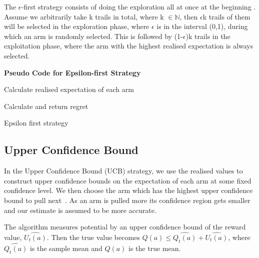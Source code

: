     The $\epsilon$-first strategy consists of doing the exploration all at once at the beginning \citep{vermorel}.
    Assume we arbitrarily take k trails in total, where k $\in \mathbb{N}$, then $\epsilon$k trails of them will be selected in the exploration phase, where $\epsilon$ is in the interval (0,1), during which an arm is randomly selected.
    This is followed by (1-$\epsilon$)k trails in the exploitation phase, where the arm with the highest realised expectation is always selected.
    \par
    \textbf{Pseudo Code for Epsilon-first Strategy}
    \newline
    \begin{algorithm}[H]
        Calculate realised expectation of each arm\;

        Calculate and return regret
        \caption{Epsilon first strategy}\label{alg:epsilon_algorithm}
    \end{algorithm}

    \subsection{Upper Confidence Bound}\label{subsec:upper-confidence-bound}
    In the Upper Confidence Bound (UCB) strategy, we use the realised values to construct upper confidence bounds on the expectation of each arm at some fixed confidence level.
    We then choose the arm which has the highest upper confidence bound to pull next~\citep{SVGarbar2012}. As an arm is pulled more its confidence region gets smaller and our estimate is assumed to be more accurate.
    \par
    The algorithm measures potential by an upper confidence bound of the reward value, $\widehat{U_t (a)}$.
    Then the true value becomes $ Q(a)  \leq \widehat{Q_t (a)}+\widehat{U_t (a)} $, where  $ \widehat{Q_t (a)}$ is the sample mean and $ Q(a)$ is the true mean.

